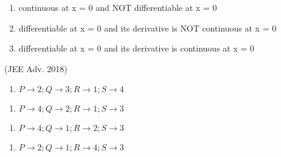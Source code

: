 \documentclass[journal,12pt,twocolumn]{IEEEtran}
\theoremstyle{remark}
\begin{document}
\begin{enumerate}
\begin{multicols}{2}
\begin{enumerate}
					\item  continuous at x = 0 and NOT differentiable at x = 0
					\item differentiable at x = 0 and its derivative is NOT continuous at x = 0
					\item differentiable at x = 0 and its derivative is continuous at x = 0
				\end{enumerate}
                 \hfill(JEE Adv. 2018)
		\end{multicols}
            \begin{multicols}{2}
			\begin{enumerate}[label=(\alph*)]
				\item $P\rightarrow2;Q\rightarrow3;R\rightarrow1;S\rightarrow4$
			\end{enumerate}
			\begin{enumerate}[label=(\alph*), start=3]
				\item $P\rightarrow4;Q\rightarrow2;R\rightarrow1;S\rightarrow3$
			\end{enumerate}
			\columnbreak
			\begin{enumerate}[label=(\alph*), start=2]
				\item $P\rightarrow4;Q\rightarrow1;R\rightarrow2;S\rightarrow3$
			\end{enumerate}
			\begin{enumerate}[label=(\alph*)]
				\item $P\rightarrow2;Q\rightarrow1;R\rightarrow4;S\rightarrow3$
			\end{enumerate}
		\end{multicols}
\twocolumn

\end{enumerate}
\end{document}
